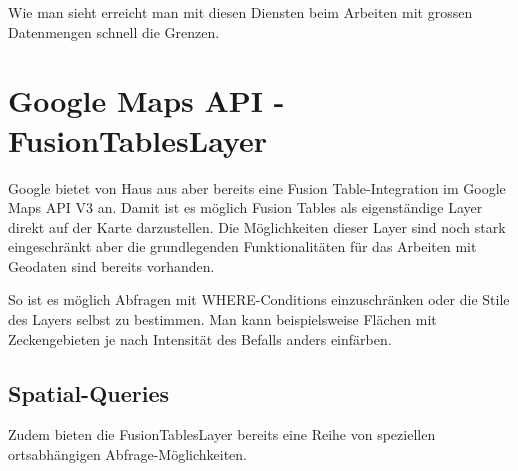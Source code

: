Wie man sieht erreicht man mit diesen Diensten beim Arbeiten mit grossen Datenmengen schnell die Grenzen.

\section{Google Maps API - FusionTablesLayer}
Google bietet von Haus aus aber bereits eine Fusion Table-Integration im Google Maps API V3 an. Damit ist es möglich Fusion Tables als eigenständige Layer direkt auf der Karte darzustellen.
Die Möglichkeiten dieser Layer sind noch stark eingeschränkt aber die grundlegenden Funktionalitäten für das Arbeiten mit Geodaten sind bereits vorhanden.

So ist es möglich Abfragen mit WHERE-Conditions einzuschränken oder die Stile des Layers selbst zu bestimmen. Man kann beispielsweise Flächen mit Zeckengebieten je nach Intensität des Befalls anders einfärben.

\subsection{Spatial-Queries}
Zudem bieten die FusionTablesLayer bereits eine Reihe von speziellen ortsabhängigen Abfrage-Möglichkeiten.

